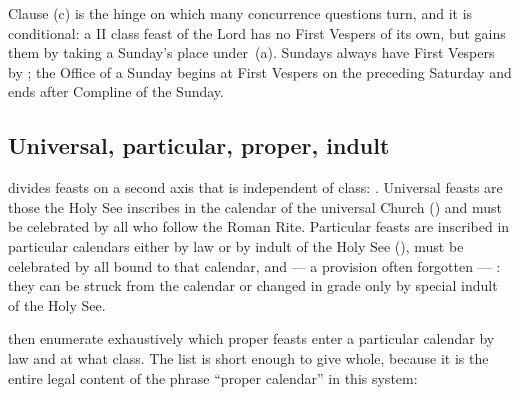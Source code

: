 Clause (c) is the hinge on which many concurrence questions turn, and it is conditional: a II
class feast of the Lord has no First Vespers of its own, but gains them by taking a Sunday's
place under \,(a). Sundays always have First Vespers by ; the Office of a Sunday
begins at First Vespers on the preceding Saturday and ends after Compline of the Sunday.

\subsection{Universal, particular, proper, indult}

 divides feasts on a second axis that is independent of class: . Universal feasts
are those the Holy See inscribes in the calendar of the universal Church () and must be
celebrated by all who follow the Roman Rite. Particular feasts are inscribed in particular
calendars either by law or by indult of the Holy See (), must be celebrated by all bound
to that calendar, and — a provision often forgotten — : they can be struck from the calendar or
changed in grade only by special indult of the Holy See.

 then enumerate exhaustively which proper feasts enter a particular calendar by law
and at what class. The list is short enough to give whole, because it is the entire legal
content of the phrase ``proper calendar'' in this system:

